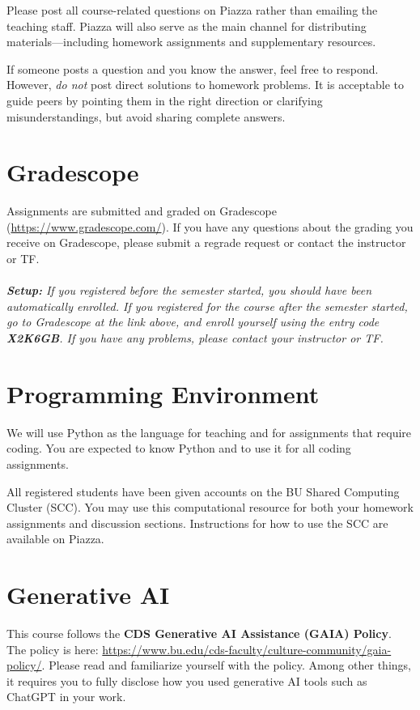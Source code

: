 \documentclass[11pt]{article}
\begin{document}
Please post all course-related questions on Piazza rather than emailing the teaching staff. Piazza will also serve as the main channel for distributing materials—including homework assignments and supplementary resources.

If someone posts a question and you know the answer, feel free to respond. However, \emph{do not} post direct solutions to homework problems. It is acceptable to guide peers by pointing them in the right direction or clarifying misunderstandings, but avoid sharing complete answers.

\section*{Gradescope}

Assignments are submitted and graded on Gradescope
(\url{https://www.gradescope.com/}). If you have any questions
about the grading you receive on Gradescope, please submit a regrade request or contact the instructor or TF.
\\
~\\\emph{\textbf{Setup:} If you registered before the semester started, you should have been automatically enrolled. If you registered for the course after the semester started, go to Gradescope at the link above, and enroll yourself using the entry code {\bf X2K6GB}. If you have any problems, please contact your instructor or TF.}

\section*{Programming Environment}

We will use Python as the language for teaching and for
assignments that require coding. You are expected to know Python and
to use it for all coding assignments.

All registered students have been given accounts on the BU Shared Computing Cluster (SCC). You may use this computational resource for both your homework assignments and discussion sections. Instructions for how to use the SCC are available on Piazza.

\section*{Generative AI}

This course follows the \textbf{CDS Generative AI Assistance (GAIA) Policy}. The policy is here:
\url{https://www.bu.edu/cds-faculty/culture-community/gaia-policy/}.
Please read and familiarize yourself with the policy.  Among other
things, it requires you to fully disclose how you used generative AI
tools such as ChatGPT in your work. 
\end{document}
